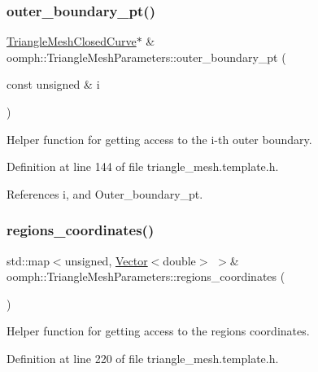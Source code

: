 \subsubsection{\texorpdfstring{outer\+\_\+boundary\+\_\+pt()}{outer\_boundary\_pt()}\hspace{0.1cm}{\footnotesize\ttfamily [4/4]}}
{\footnotesize\ttfamily \hyperlink{classoomph_1_1TriangleMeshClosedCurve}{Triangle\+Mesh\+Closed\+Curve}$\ast$ \& oomph\+::\+Triangle\+Mesh\+Parameters\+::outer\+\_\+boundary\+\_\+pt (\begin{DoxyParamCaption}\item[{const unsigned \&}]{i }\end{DoxyParamCaption})\hspace{0.3cm}{\ttfamily [inline]}}



Helper function for getting access to the i-\/th outer boundary. 



Definition at line 144 of file triangle\+\_\+mesh.\+template.\+h.



References i, and Outer\+\_\+boundary\+\_\+pt.

\mbox{\label{classoomph_1_1TriangleMeshParameters_ad89d2f2d75fa7d430a3ca02fbd4b64f8}} 
\subsubsection{\texorpdfstring{regions\+\_\+coordinates()}{regions\_coordinates()}}
{\footnotesize\ttfamily std\+::map$<$unsigned, \hyperlink{classoomph_1_1Vector}{Vector}$<$double$>$ $>$\& oomph\+::\+Triangle\+Mesh\+Parameters\+::regions\+\_\+coordinates (\begin{DoxyParamCaption}{ }\end{DoxyParamCaption})\hspace{0.3cm}{\ttfamily [inline]}}



Helper function for getting access to the regions coordinates. 



Definition at line 220 of file triangle\+\_\+mesh.\+template.\+h.



